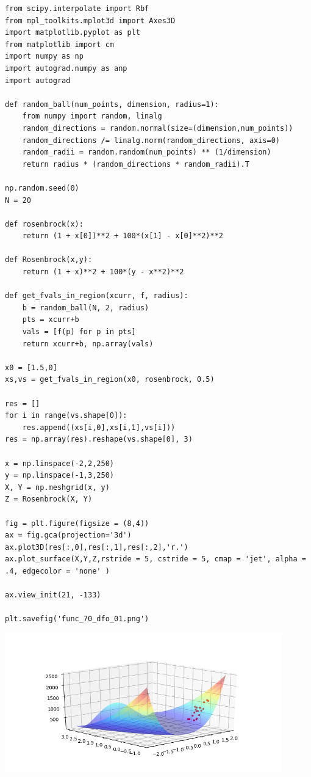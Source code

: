 \documentclass[12pt,fleqn]{article}\usepackage{../../common}
\begin{document}
\begin{verbatim}
from scipy.interpolate import Rbf
from mpl_toolkits.mplot3d import Axes3D
import matplotlib.pyplot as plt
from matplotlib import cm
import numpy as np
import autograd.numpy as anp
import autograd

def random_ball(num_points, dimension, radius=1):
    from numpy import random, linalg
    random_directions = random.normal(size=(dimension,num_points))
    random_directions /= linalg.norm(random_directions, axis=0)
    random_radii = random.random(num_points) ** (1/dimension)
    return radius * (random_directions * random_radii).T

np.random.seed(0)
N = 20

def rosenbrock(x):
    return (1 + x[0])**2 + 100*(x[1] - x[0]**2)**2

def Rosenbrock(x,y):
    return (1 + x)**2 + 100*(y - x**2)**2

def get_fvals_in_region(xcurr, f, radius):    
    b = random_ball(N, 2, radius)
    pts = xcurr+b
    vals = [f(p) for p in pts]
    return xcurr+b, np.array(vals)

x0 = [1.5,0]
xs,vs = get_fvals_in_region(x0, rosenbrock, 0.5)

res = []
for i in range(vs.shape[0]):
    res.append((xs[i,0],xs[i,1],vs[i]))
res = np.array(res).reshape(vs.shape[0], 3)

x = np.linspace(-2,2,250)
y = np.linspace(-1,3,250)
X, Y = np.meshgrid(x, y)
Z = Rosenbrock(X, Y)

fig = plt.figure(figsize = (8,4))
ax = fig.gca(projection='3d')
ax.plot3D(res[:,0],res[:,1],res[:,2],'r.')
ax.plot_surface(X,Y,Z,rstride = 5, cstride = 5, cmap = 'jet', alpha = .4, edgecolor = 'none' )

ax.view_init(21, -133)

plt.savefig('func_70_dfo_01.png')
\end{verbatim}

\includegraphics[height=6cm]{func_70_dfo_01.png}
\end{document}
